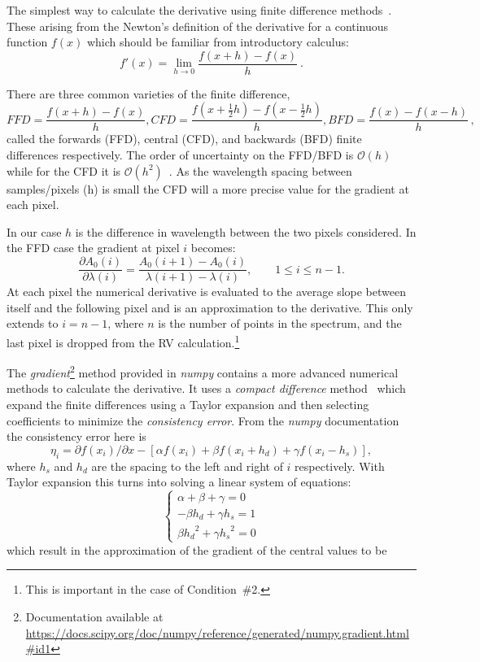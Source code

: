The simplest way to calculate the derivative using finite difference methods~\citep{quarteroni_numerical_2000}.
These arising from the Newton's definition of the derivative for a continuous function \(f(x)\) which should be familiar from introductory calculus:
\[f'(x) = \lim_{h \to 0} \frac{f(x+h)-f(x)}{h}~.\]

There are three common varieties of the finite difference,
\begin{equation}
 {FFD} = \frac{f(x+h)-f(x)}{h}, {CFD}=\frac{f(x+\frac{1}{2}h)-f(x-\frac{1}{2}h)}{h}, {BFD}=\frac{f(x)-f(x-h)}{h}\,,
\end{equation}
called the forwards ({FFD}), central ({CFD}), and backwards ({BFD}) finite differences respectively.
The order of uncertainty on the {FFD}/{BFD} is \(\mathcal{O}(h)\) while for the {CFD} it is \(\mathcal{O}({h}^{2})\)~\citep{quarteroni_numerical_2000}.
As the wavelength spacing between samples/pixels (h) is small the {CFD} will a more precise value for the gradient at each pixel.

In our case \(h\) is the difference in wavelength between the two pixels considered.
In the {FFD} case the gradient at pixel \(i\) becomes:
\begin{equation}
\frac{\partial A_0(i)}{\partial\lambda(i)} = \frac{A_0(i+1) - A_0(i)}{\lambda(i+1)-\lambda(i)}, \hspace{2em} 1 \leq i \leq n-1.
\label{eqn:ffd_precision}
\end{equation}
At each pixel the numerical derivative is evaluated to the average slope between itself and the following pixel and is an approximation to the derivative.
This only extends to \(i= n-1\), where \(n\) is the number of points in the spectrum, and the last pixel is dropped from the {RV} calculation.\footnote{This is important in the case of Condition~\#2.}


The \emph{gradient}\footnote{Documentation available at \href{https://docs.scipy.org/doc/numpy/reference/generated/numpy.gradient.html\#id1 }{https://docs.scipy.org/doc/numpy/reference/generated/numpy.gradient.html\#id1}}  method provided in \emph{numpy} contains a more advanced numerical methods to calculate the derivative.
It uses a \textit{compact difference} method~\citep{quarteroni_numerical_2000} which expand the finite differences using a Taylor expansion and then selecting coefficients to minimize the \textit{consistency error}.
From the \emph{numpy} documentation the consistency error here is \[\eta_i = \partial{f(x_i)}/\partial{x} -  [\alpha f(x_i) + \beta f(x_i +h_d) + \gamma f(x_i - h_s)],\] where \(h_s\) and \(h_d\) are the spacing to the left and right of \(i\) respectively.
With Taylor expansion this turns into solving a linear system of equations:
\[\begin{cases}
         \alpha + \beta + \gamma = 0\\
         -\beta {h_d} + \gamma {h_s} = 1\\
         \beta {h_{d}}^{2} + \gamma {h_{s}}^{2} = 0
    \end{cases}
\]
which result in the approximation of the gradient of the central values to be

